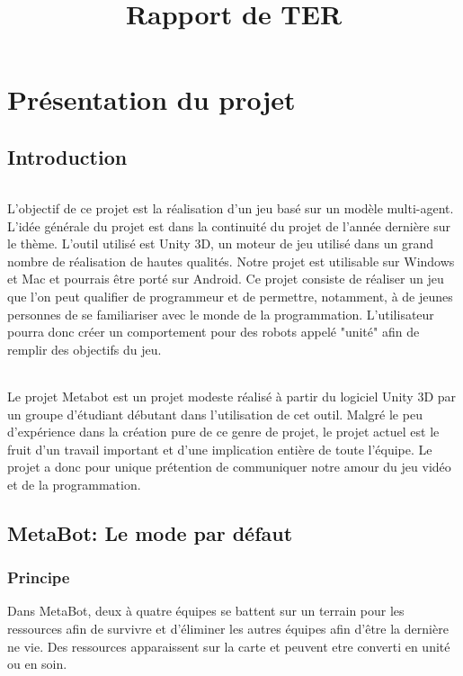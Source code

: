 \documentclass{report}
\title{Rapport de TER}
\begin{document}
\maketitle
\newpage
\tableofcontents
\newpage

\part{Présentation du projet}
\chapter{Introduction}
\paragraph{}
L'objectif de ce projet est la réalisation d'un jeu basé sur un modèle multi-agent. L'idée générale du projet est dans la continuité du projet de l'année dernière sur le thème. L'outil utilisé est Unity 3D, un moteur de jeu utilisé dans un grand nombre de réalisation de hautes qualités. Notre projet est utilisable sur Windows et Mac et pourrais être porté sur Android.
Ce projet consiste de réaliser un jeu que l'on peut qualifier de programmeur et de permettre, notamment, à de jeunes personnes de se familiariser avec le monde de la programmation. L'utilisateur pourra donc créer un comportement pour des robots appelé "unité" afin de remplir des objectifs du jeu.
\paragraph{}
Le projet Metabot est un projet modeste réalisé à partir du logiciel Unity 3D par un groupe d'étudiant débutant dans l'utilisation de cet outil. Malgré le peu d'expérience dans la création pure de ce genre de projet, le projet actuel est le fruit d'un travail important et d'une implication entière de toute l'équipe.
Le projet a donc pour unique prétention de communiquer notre amour du jeu vidéo et de la programmation.
\newpage
\chapter{MetaBot: Le mode par défaut}
\section{Principe}
Dans MetaBot, deux à quatre équipes se battent sur un terrain pour les ressources afin de survivre et d'éliminer les autres équipes afin d’être la dernière ne vie. Des ressources apparaissent sur la carte et peuvent etre converti en unité ou en soin.
\end{document}
